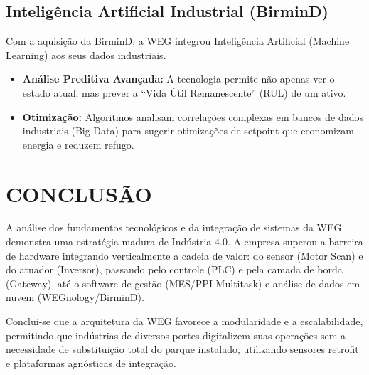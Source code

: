 \documentclass[12pt,a4paper,oneside]{abntex2}
\begin{document}
\section{Inteligência Artificial Industrial (BirminD)}

Com a aquisição da BirminD, a WEG integrou Inteligência Artificial (Machine Learning) aos seus dados industriais.

\begin{itemize}
  \item \textbf{Análise Preditiva Avançada:} A tecnologia permite não apenas ver o estado atual, mas prever a ``Vida Útil Remanescente'' (RUL) de um ativo.
  \item \textbf{Otimização:} Algoritmos analisam correlações complexas em bancos de dados industriais (Big Data) para sugerir otimizações de setpoint que economizam energia e reduzem refugo.
\end{itemize}

\chapter{CONCLUSÃO}

A análise dos fundamentos tecnológicos e da integração de sistemas da WEG demonstra uma estratégia madura de Indústria 4.0. A empresa superou a barreira de hardware integrando verticalmente a cadeia de valor: do sensor (Motor Scan) e do atuador (Inversor), passando pelo controle (PLC) e pela camada de borda (Gateway), até o software de gestão (MES/PPI-Multitask) e análise de dados em nuvem (WEGnology/BirminD).

Conclui-se que a arquitetura da WEG favorece a modularidade e a escalabilidade, permitindo que indústrias de diversos portes digitalizem suas operações sem a necessidade de substituição total do parque instalado, utilizando sensores retrofit e plataformas agnósticas de integração.



\end{document}
